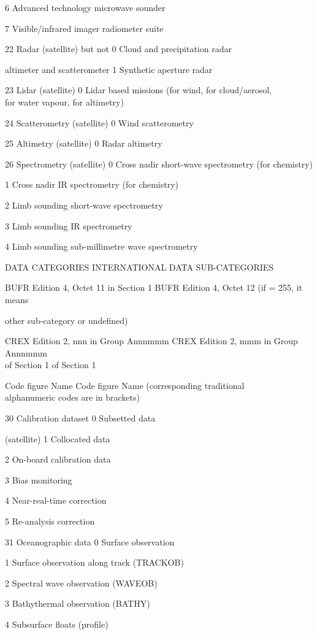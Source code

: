 6 Advanced technology microwave sounder

7 Visible/infrared imager radiometer suite

22 Radar (satellite) but not 0 Cloud and precipitation radar

altimeter and scatterometer 1 Synthetic aperture radar

23 Lidar (satellite) 0 Lidar based missions (for wind, for cloud/aerosol,\\
for water vapour, for altimetry)

24 Scatterometry (satellite) 0 Wind scatterometry

25 Altimetry (satellite) 0 Radar altimetry

26 Spectrometry (satellite) 0 Cross nadir short-wave spectrometry (for chemistry)

1 Cross nadir IR spectrometry (for chemistry)

2 Limb sounding short-wave spectrometry

3 Limb sounding IR spectrometry

4 Limb sounding sub-millimetre wave spectrometry

DATA CATEGORIES INTERNATIONAL DATA SUB-CATEGORIES

BUFR Edition 4, Octet 11 in Section 1 BUFR Edition 4, Octet 12 (if = 255, it means

other sub-category or undefined)

CREX Edition 2, nnn in Group Annnmmm CREX Edition 2, mmm in Group Annnmmm\\
of Section 1 of Section 1

Code figure Name Code figure Name (corresponding traditional\\
alphanumeric codes are in brackets)

30 Calibration dataset 0 Subsetted data

(satellite) 1 Collocated data

2 On-board calibration data

3 Bias monitoring

4 Near-real-time correction

5 Re-analysis correction

31 Oceanographic data 0 Surface observation

1 Surface observation along track (TRACKOB)

2 Spectral wave observation (WAVEOB)

3 Bathythermal observation (BATHY)

4 Subsurface floats (profile)

